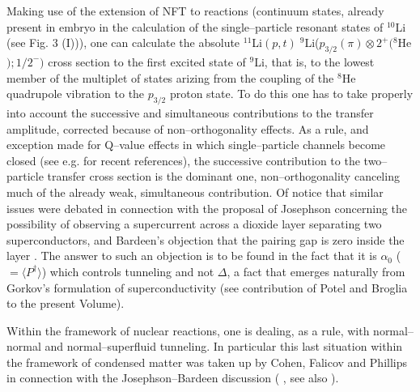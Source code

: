 \documentclass[a4paper,14pt]{book}
\begin{document}

Making use of the extension of NFT to reactions \cite{Broglia:05} (continuum states, already present in embryo in the calculation of the single--particle resonant states of ${}^{10}$Li (see Fig. 3 (I))), one can calculate the absolute ${}^{11}$Li$(p,t) \;{}^9$Li($p_{3/2}(\pi) \otimes 2^+ ({}^8$He$); 1/2^{-})$ cross section to the first excited state of ${}^9$Li, that is, to the lowest member of the multiplet of states arizing from the coupling of the ${}^8$He quadrupole vibration to the $p_{3/2}$ proton state. To do this one has to take properly into account the successive and simultaneous contributions to the transfer amplitude, corrected because of  non--orthogonality effects. As a rule, and exception made for 
Q--value effects in which single--particle channels become closed
 (see e.g.\cite{Potel:11,Wimmer:10} for recent references), the successive contribution to the two--particle transfer cross section is the dominant one, non--orthogonality canceling much of the already weak, simultaneous contribution. Of notice that similar issues were debated in connection with the proposal of Josephson \cite{Josephson:62} concerning the possibility of observing a supercurrent across a dioxide layer separating two superconductors, and Bardeen's objection that the pairing gap is zero inside the layer \cite{Bardeen:62}. The answer to such an objection is to be found in the fact that it is $\alpha_0$ ($=\langle P ^{\dagger} \rangle $) which controls tunneling and not $\Delta$, a fact that emerges naturally from Gorkov's formulation of superconductivity (see contribution of Potel and Broglia to the present Volume).

Within the framework of nuclear reactions, one is dealing, as a rule, with normal--normal and normal--superfluid tunneling. In particular this last situation within the framework of condensed matter was taken up by Cohen, Falicov and Phillips in connection with the Josephson--Bardeen discussion (\cite{Josephson:62,Bardeen:62,Cohen:62} , see also \cite{Anderson:63} ).


\end{document}
